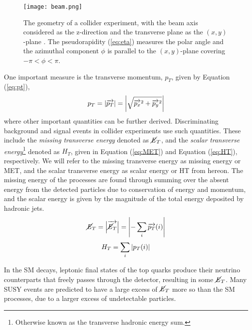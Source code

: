 \begin{figure}[htbp]
    \centering
    \texttt{[image: beam.png]}
    \caption{The geometry of a collider experiment, with the beam axis considered as the z-direction and the transverse plane as the $(x,y)$-plane \cite{barr2011guide}. The pseudorapidity (\ref{eq:eta}) measures the polar angle and the azimuthal component $\phi$ is parallel to the $(x,y)$-plane covering $-\pi < \phi < \pi$. }
    \label{fig:beam}
\end{figure}

One important measure is the transverse momentum, $p_T$, given by Equation (\ref{eq:pt}), 
\begin{equation}
    p_T = \abs{\overrightarrow{p_T}} = \abs{\sqrt{\overrightarrow{p_x}^2 + \overrightarrow{p_y}^2}}
    \label{eq:pt}
\end{equation}
where other important quantities can be further derived. Discriminating background and signal events in collider experiments use such quantities. These include the \textit{missing transverse energy} denoted as $\cancel{\it{E}}_{T}$, and the \textit{scalar transverse energy}\footnote{Otherwise known as the transverse hadronic energy sum.} denoted as $H_T$, given in Equation (\ref{eq:MET}) and Equation (\ref{eq:HT}), respectively. We will refer to the missing transverse energy as missing energy or MET, and the scalar transverse energy as scalar energy or HT from hereon. The missing energy of the processes are found through summing over the absent energy from the detected particles due to conservation of energy and momentum, and the scalar energy is given by the magnitude of the total energy deposited by hadronic jets. \\
\begin{equation}
    \cancel{\it{E}}_{T} = \abs{\overrightarrow{\cancel{\it{E}}_{T}}} = \abs{- \sum_i \overrightarrow{p_T}(i)}
    \label{eq:MET}
\end{equation}
\begin{equation}
    H_T = \sum_i \abs{p_T(i)} 
    \label{eq:HT}
\end{equation}

In the SM decays, leptonic final states of the top quarks produce their neutrino counterparts that freely passes through the detector, resulting in some $\cancel{\it{E}}_{T}$. Many SUSY events are predicted to have a large excess of $\cancel{\it{E}}_{T}$ more so than the SM processes, due to a larger excess of undetectable particles.  \\ 


